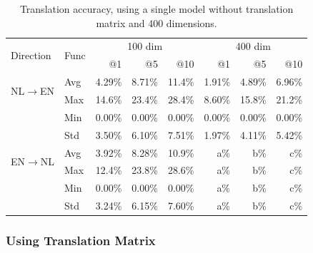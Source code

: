 \begin{table}[ht!]
	\centering
	\label{table:results_single_model_no_matrix}
	\begin{tabular}{|l|l|r|r|r|r|r|r|}
	\hline
	\multirow{2}{*}{Direction} 	& \multirow{2}{*}{Func}	& \multicolumn{3}{c|}{100 dim}  		& \multicolumn{3}{c|}{400 dim} 	 \\ \cline{3-8} 
                  				&	 					& @1 		& @5 		& @10 	 		& @1 		& @5 		& @10 	 \\ \hline
    \multirow{2}{*}{NL$\to$EN}	& Avg					& 4.29\%	& 8.71\%	& 11.4\%		& 1.91\%	& 4.89\%	& 6.96\% \\ \cline{2-8} 
    							& Max					& 14.6\%	& 23.4\%	& 28.4\%		& 8.60\%	& 15.8\%	& 21.2\% \\ \cline{2-8} 
    							& Min					& 0.00\%	& 0.00\%	& 0.00\%		& 0.00\%	& 0.00\%	& 0.00\% \\ \cline{2-8} 
    							& Std					& 3.50\%	& 6.10\%	& 7.51\%		& 1.97\%	& 4.11\%	& 5.42\% \\ \hline
    \multirow{2}{*}{EN$\to$NL}	& Avg					& 3.92\%	& 8.28\%	& 10.9\%		& a\%		& b\%		& c\% 	\\ \cline{2-8} 
    							& Max					& 12.4\%	& 23.8\%	& 28.6\%		& a\%		& b\%		& c\% 	\\ \cline{2-8} 
    							& Min					& 0.00\%	& 0.00\%	& 0.00\%		& a\%		& b\%		& c\% 	\\ \cline{2-8} 
    							& Std					& 3.24\%	& 6.15\%	& 7.60\%		& a\%		& b\%		& c\% 	\\ \hline
	\end{tabular}
	\caption{Translation accuracy, using a single model without translation matrix and 400 dimensions.}
\end{table}







\subsubsection{Using Translation Matrix}
